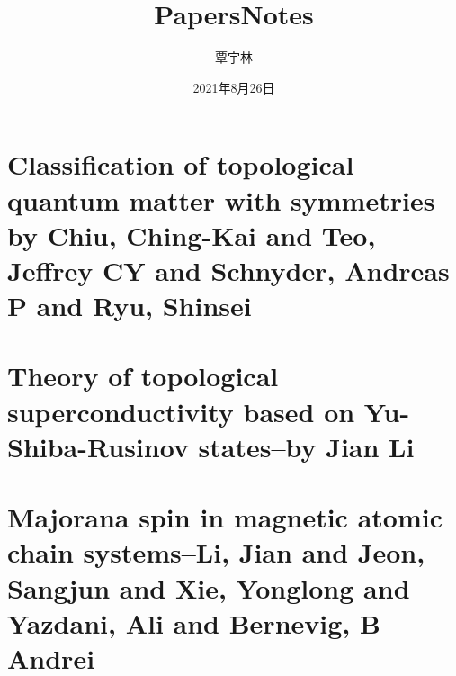








\setlength{\droptitle}{-2cm}
\pretitle{\begin{center}\LARGE\sffamily}
\title{PapersNotes}
\posttitle{\par\end{center}\vspace{-0.3cm}}
\preauthor{\large}
\DeclareRobustCommand{\authorthing}
{
\begin{center}
\begin{tabular}{c}%
覃宇林\\
\end{tabular}
\end{center}
}
\author{\authorthing}
\postauthor{}
\predate{\begin{center}\large\scshape}
\date{2021年8月26日}
\postdate{\par\end{center}}


\frontpagestyle
\maketitle
{}
\tableofcontents\newpage
{}
\mainpagestyle
\setcounter{page}{1}

\part{Classification of topological quantum matter with symmetries by Chiu, Ching-Kai and Teo, Jeffrey CY and Schnyder, Andreas P and Ryu, Shinsei}

\clearpage

\part{Theory of topological superconductivity based on Yu-Shiba-Rusinov states--by Jian Li}

\clearpage

\part{Majorana spin in magnetic atomic chain systems--Li, Jian and Jeon, Sangjun and Xie, Yonglong and Yazdani, Ali and Bernevig, B Andrei}

\clearpage

